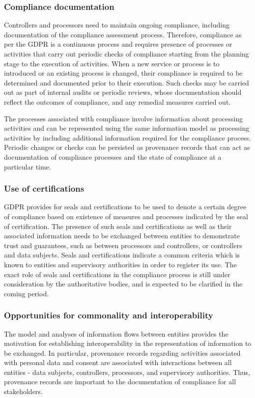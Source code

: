 \subsubsection{Compliance documentation}
Controllers and processors need to maintain ongoing compliance, including documentation of the compliance assessment process. Therefore, compliance as per the GDPR is a continuous process and requires presence of processes or activities that carry out periodic checks of compliance starting from the planning stage to the execution of activities.
When a new service or process is to introduced or an existing process is changed, their compliance is required to be determined and documented prior to their execution.
Such checks may be carried out as part of internal audits or periodic reviews, whose documentation should reflect the outcomes of compliance, and any remedial measures carried out.

The processes associated with compliance involve information about processing activities and can be represented using the same information model as processing activities by including additional information required for the compliance process. Periodic changes or checks can be persisted as provenance records that can act as documentation of compliance processes and the state of compliance at a particular time.

\subsubsection{Use of certifications}
GDPR provides for seals and certifications to be used to denote a certain degree of compliance based on existence of measures and processes indicated by the seal of certification. The presence of such seals and certifications as well as their associated information needs to be exchanged between entities to demonstrate trust and guarantees, such as between processors and controllers, or controllers and data subjects. Seals and certifications indicate a common criteria which is known to entities and supervisory authorities in order to register its use. The exact role of seals and certifications in the compliance process is still under consideration by the authoritative bodies, and is expected to be clarified in the coming period.

\subsubsection{Opportunities for commonality and interoperability}
The model and analyses of information flows between entities provides the motivation for establishing interoperability in the representation of information to be exchanged. In particular, provenance records regarding activities associated with personal data and consent are associated with interactions between all entities - data subjects, controllers, processors, and supervisory authorities. Thus, provenance records are important to the documentation of compliance for all stakeholders. 

